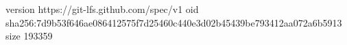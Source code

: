 version https://git-lfs.github.com/spec/v1
oid sha256:7d9b53f646ae086412575f7d25460c440e3d02b45439be793412aa072a6b5913
size 193359
